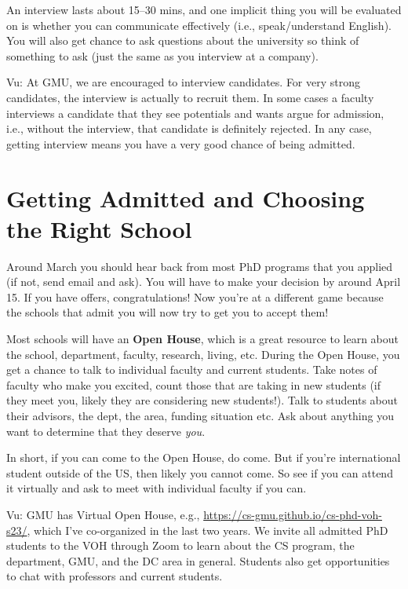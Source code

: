 \documentclass[11pt]{article}
\begin{document}
An interview lasts about 15--30 mins, and one implicit thing you will be evaluated on is whether you can communicate effectively (i.e., speak/understand English).  You will also get chance to ask questions about the university so think of something to ask (just the same as you interview at a company).

\begin{tcolorbox}[left=1pt,right=1pt,top=1pt,bottom=1pt]
Vu: At GMU, we are encouraged to interview candidates. For very strong candidates, the interview is actually to recruit them.  In some cases a faculty interviews a candidate that they see potentials and wants argue for admission, i.e., without the interview, that candidate is definitely rejected. In any case, getting interview means you have a very good chance of being admitted.
\end{tcolorbox}

\section{Getting Admitted and Choosing the Right School}

Around March you should hear back from most PhD programs that you applied (if not, send email and ask). You will have to make your decision by around April 15.
If you have offers, congratulations!  Now you're at a different game because the schools that admit you will now try to get you to accept them!  

Most schools will have an \textbf{Open House}, which is a great resource to learn about the school, department, faculty, research, living, etc. During the Open House, you get a chance to talk to individual faculty and current students.  Take notes of faculty who make you excited, count those that are taking in new students (if they meet you, likely they are considering new students!).  Talk to students about their advisors, the dept, the area, funding situation etc.  Ask about anything you want to determine that they deserve \emph{you}.

In short, if you can come to the Open House, do come.  But if you're international student outside of the US, then likely you cannot come.  So see if you can attend it virtually and ask to meet with individual faculty if you can.

\begin{tcolorbox}[left=1pt,right=1pt,top=1pt,bottom=1pt]
Vu: GMU has Virtual Open House, e.g., \url{https://cs-gmu.github.io/cs-phd-voh-s23/}, which I've co-organized in the last two years. We invite all admitted PhD students to the VOH through Zoom to learn about the CS program, the department, GMU, and the DC area in general. Students also get opportunities to chat with professors and current students.
\end{tcolorbox}
\end{document}
